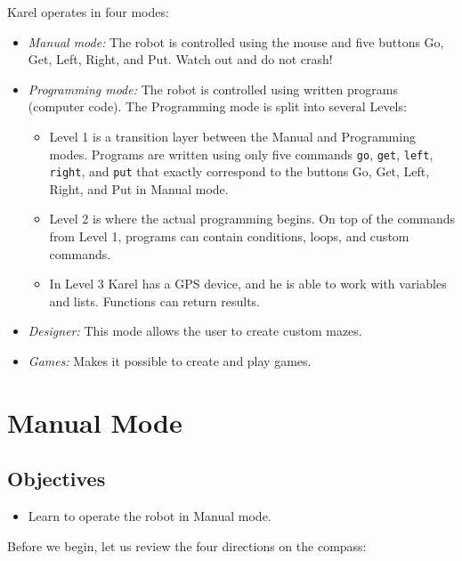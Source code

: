 Karel operates in four modes:
\begin{itemize}
\item {\em Manual mode:} The robot is controlled using the mouse and five buttons Go, Get, Left, Right, and Put. 
      Watch out and do not crash!
\item {\em Programming mode:} The robot is controlled using written programs (computer code). The Programming mode is 
      split into several Levels:
\begin{itemize}
\item Level 1 is a transition layer between the Manual and Programming modes. Programs are written using only 
      five commands {\tt go}, {\tt get}, {\tt left}, {\tt right}, and {\tt put} that exactly correspond to 
      the buttons Go, Get, Left, Right, and Put in Manual mode.
\item Level 2 is where the actual programming begins. On top of the commands from Level 1, programs can contain 
      conditions, loops, and custom commands.
\item In Level 3 Karel has a GPS device, and he is able to work with variables and lists. Functions
      can return results.
\end{itemize}
\item {\em Designer:} This mode allows the user to create custom mazes.
\item {\em Games:} Makes it possible to create and play games. 
\end{itemize}


\section{Manual Mode} \label{sec:manual}

\subsection{Objectives} 
\begin{itemize}
\item Learn to operate the robot in Manual mode.
\end{itemize}
\noindent
Before we begin, let us review the four directions on the compass:\\[-7mm]

